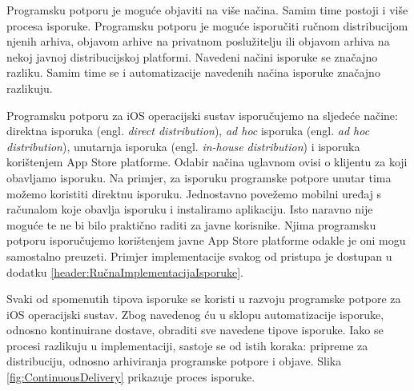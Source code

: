 \documentclass[times, utf8, diplomski, numeric]{fer}
\newcommand{\eng}[1]{(engl. \textit{#1})}
\begin{document}
Programsku potporu je moguće objaviti na više načina. Samim time postoji i više procesa isporuke. Programsku potporu je moguće isporučiti ručnom distribucijom njenih arhiva, objavom arhive na privatnom poslužitelju ili objavom arhiva na nekoj javnoj distribucijskoj platformi. Navedeni načini isporuke se značajno razliku. Samim time se i automatizacije navedenih načina isporuke značajno razlikuju.

Programsku potporu za iOS operacijski sustav isporučujemo na sljedeće načine: direktna isporuka \eng{direct distribution}, \textit{ad hoc} isporuka \eng{ad hoc distribution}, unutarnja isporuka \eng{in-house distribution} i isporuka korištenjem App Store platforme. Odabir načina uglavnom ovisi o klijentu za koji obavljamo isporuku. Na primjer, za isporuku programske potpore unutar tima možemo koristiti direktnu isporuku. Jednostavno povežemo mobilni uređaj s računalom koje obavlja isporuku i instaliramo aplikaciju. Isto naravno nije moguće te ne bi bilo praktično raditi za javne korisnike. Njima programsku potporu isporučujemo korištenjem javne App Store platforme odakle je oni mogu samostalno preuzeti. Primjer implementacije svakog od pristupa je dostupan u dodatku \ref{header:RučnaImplementacijaIsporuke}.

Svaki od spomenutih tipova isporuke se koristi u razvoju programske potpore za iOS operacijski sustav. Zbog navedenog ću u sklopu automatizacije isporuke, odnosno kontinuirane dostave, obraditi sve navedene tipove isporuke. Iako se procesi razlikuju u implementaciji, sastoje se od istih koraka: pripreme za distribuciju, odnosno arhiviranja programske potpore i objave. Slika \ref{fig:ContinuousDelivery} prikazuje proces isporuke.
\end{document}
